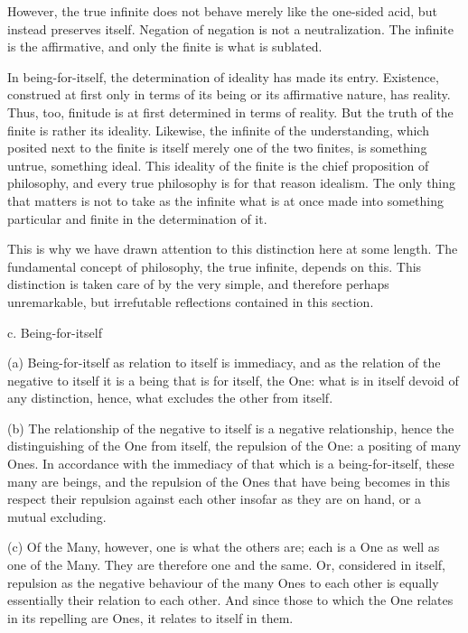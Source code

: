     However, the true infinite does not behave merely like
    the one-sided acid, but instead preserves itself.
    Negation of negation is not a neutralization.
    The infinite is the affirmative,
    and only the finite is what is sublated.

    In being-for-itself, the determination of
    ideality has made its entry.
    Existence, construed at first only
    in terms of its being or
    its affirmative nature, has reality.
    Thus, too, finitude is at first
    determined in terms of reality.
    But the truth of the finite is rather its ideality.
    Likewise, the infinite of the understanding,
    which posited next to the finite is
    itself merely one of the two finites,
    is something untrue, something ideal.
    This ideality of the finite is the
    chief proposition of philosophy,
    and every true philosophy is
    for that reason idealism.
    The only thing that matters is not to take as the infinite
    what is at once made into something particular and finite
    in the determination of it.

    This is why we have drawn attention to this distinction here at some length.
    The fundamental concept of philosophy, the true infinite, depends on this.
    This distinction is taken care of by the very simple, and therefore perhaps unremarkable,
    but irrefutable reflections contained in this section.

c. Being-for-itself

(a) Being-for-itself as relation to itself is immediacy,
and as the relation of the negative to itself
it is a being that is for itself, the One:
what is in itself devoid of any distinction,
hence, what excludes the other from itself.

(b) The relationship of the negative to itself is
a negative relationship,
hence the distinguishing of the One from itself,
the repulsion of the One: a positing of many Ones.
In accordance with the immediacy of
that which is a being-for-itself,
these many are beings, and
the repulsion of the Ones that have being
becomes in this respect their repulsion against each other
insofar as they are on hand, or a mutual excluding.

(c) Of the Many, however, one is what the others are;
each is a One as well as one of the Many.
They are therefore one and the same.
Or, considered in itself, repulsion as
the negative behaviour of the many Ones
to each other is equally essentially
their relation to each other.
And since those to which the One relates
in its repelling are Ones,
it relates to itself in them.

